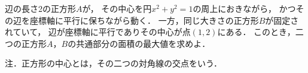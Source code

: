 \documentclass[../../main.tex]{subfiles}
\begin{document}
辺の長さ2の正方形$A$が，
その中心を円$x^2+y^2=1$の周上におきながら，
かつその辺を座標軸に平行に保ちながら動く．
一方，同じ大きさの正方形$B$が固定されていて，
辺が座標軸に平行でありその中心が点$(1,2)$にある．
このとき，二つの正方形$A$，$B$の共通部分の面積の最大値を求めよ．

注．正方形の中心とは，その二つの対角線の交点をいう．
\end{document}
